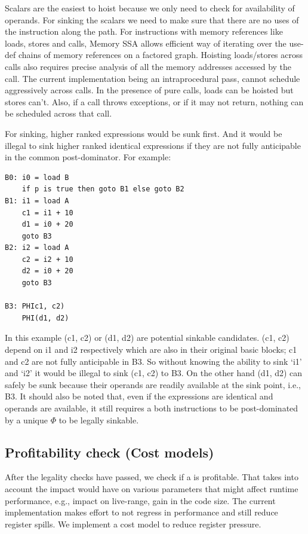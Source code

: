 \documentclass[sigplan,10pt,review,anonymous]{acmart}\settopmatter{printfolios=true,printccs=false,printacmref=false}
\begin{document}
Scalars are the easiest to hoist because we only need to check for availability
of operands. For sinking the scalars we need to make sure that there are no uses
of the instruction along the path. For instructions with memory references like
loads, stores and calls, Memory SSA allows efficient way of iterating over the
use-def chains of memory references on a factored graph. Hoisting loads/stores
across calls also requires precise analysis of all the memory addresses accessed
by the call. The current implementation being an intraprocedural pass, cannot
schedule aggressively across calls. In the presence of pure calls, loads can be
hoisted but stores can't. Also, if a call throws exceptions, or if it may not
return, nothing can be scheduled across that call.

For sinking, higher ranked expressions would be sunk first. And it would
be illegal to sink higher ranked identical expressions if they are not fully
anticipable in the common post-dominator. For example:

\begin{lstlisting}
B0: i0 = load B
    if p is true then goto B1 else goto B2
B1: i1 = load A
    c1 = i1 + 10
    d1 = i0 + 20
    goto B3
B2: i2 = load A
    c2 = i2 + 10
    d2 = i0 + 20
    goto B3

B3: PHIc1, c2)
    PHI(d1, d2)
\end{lstlisting}

In this example (c1, c2) or (d1, d2) are potential sinkable candidates.  (c1,
c2) depend on i1 and i2 respectively which are also in their original basic
blocks; c1 and c2 are not fully anticipable in B3. So without knowing the
ability to sink `i1' and `i2' it would be illegal to sink (c1, c2) to B3. On the
other hand (d1, d2) can safely be sunk because their operands are readily
available at the sink point, i.e., B3. It should also be noted that, even if the
expressions are identical and operands are available, it still requires a both
instructions to be post-dominated by a unique $\Phi$ to be legally sinkable.

\subsection{Profitability check (Cost models)}
\label{subsec:cost-models}
After the legality checks have passed, we check if a \GCM{} is profitable.  That
takes into account the impact \GCM{} would have on various parameters that might
affect runtime performance, e.g., impact on live-range, gain in the code
size. The current implementation makes effort to not regress in performance and
still reduce register spills. We implement a cost model to reduce register
pressure.
\end{document}
